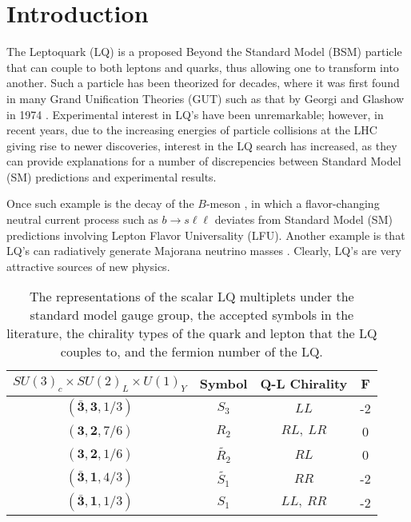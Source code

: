 \section{Introduction}
        The Leptoquark (LQ) is a proposed Beyond the Standard Model (BSM) particle that can couple to both leptons and quarks, thus allowing one to transform into another. Such a particle has been theorized for decades, where it was first found in many Grand Unification Theories (GUT) such as that by Georgi and Glashow in 1974 \cite{Georgi_1974}. Experimental interest in LQ's have been unremarkable; however, in recent years, due to the increasing energies of particle collisions at the LHC giving rise to newer discoveries, interest in the LQ search has increased, as they can provide explanations for a number of discrepencies between Standard Model (SM) predictions and experimental results. 
        
        Once such example is the decay of the $B$-meson \cite{Hiller_2014}, in which a flavor-changing neutral current process such as $b \rightarrow s \ell\ell$ deviates from Standard Model (SM) predictions involving Lepton Flavor Universality (LFU). Another example is that LQ's can radiatively generate Majorana neutrino masses \cite{Mahanta_2000}. Clearly, LQ's are very attractive sources of new physics.

        \renewcommand{\arraystretch}{1.35}
        \begin{table}[b]
            \centering
            \begin{tabular}{|c|c|c|c|}
                \hline
                $SU(3)_c \times SU(2)_L \times U(1)_Y$ & Symbol & Q-L Chirality & F \\ \hline
                $(\bar{\bm{3}}, \bm{3}, 1/3)$ & $S_3$         & $LL$      & -2 \\ \hline
                $(\bm{3}, \bm{2}, 7/6)$       & $R_2$         & $RL,\ LR$ & 0 \\ \hline
                $(\bm{3}, \bm{2}, 1/6)$       & $\tilde{R_2}$ & $RL$      & 0 \\ \hline
                $(\bar{\bm{3}}, \bm{1}, 4/3)$ & $\tilde{S_1}$ & $RR$      & -2 \\ \hline
                $(\bar{\bm{3}}, \bm{1}, 1/3)$ & $S_1$         & $LL,\ RR$ & -2 \\ \hline
            \end{tabular}
            \caption{The representations of the scalar LQ multiplets under the standard model gauge group, the accepted symbols in the literature, the chirality types of the quark and lepton that the LQ couples to, and the fermion number of the LQ.}
            \label{mulipletTable}
        \end{table}
        \renewcommand{\arraystretch}{1}

